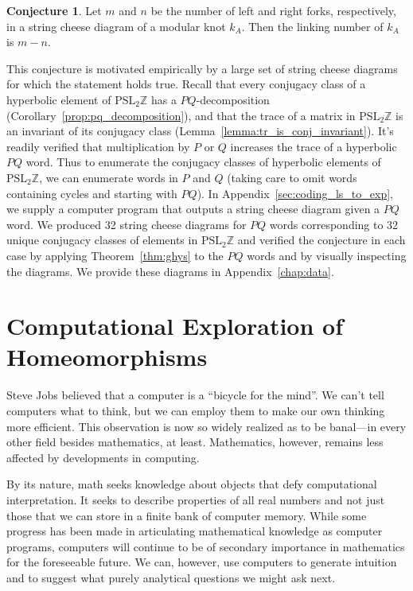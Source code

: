 \documentclass[12pt,twoside]{reedthesis}
\theoremstyle{definition}
\newtheorem{conj}[thm]{Conjecture}
\newcommand{\Z}{\mathbb{Z}}
\newcommand{\PSLZ}{\mathrm{PSL}_2{\Z}}
\begin{document}
\begin{conj}\label{conj:forking_number}
  Let $m$ and $n$ be the number of left and right forks, respectively, in a string cheese diagram of a modular knot $k_A$.
  Then the linking number of $k_A$ is $m - n$.
\end{conj}

\vspace{-1em}

This conjecture is motivated empirically by a large set of string cheese diagrams for which the statement holds true.
Recall that every conjugacy class of a hyperbolic element of $\PSLZ$ has a $PQ$-decomposition (Corollary~\ref{prop:pq_decomposition}), and that the trace of a matrix in $\PSLZ$ is an invariant of its conjugacy class (Lemma~\ref{lemma:tr_is_conj_invariant}).
It's readily verified that multiplication by $P$ or $Q$ increases the trace of a hyperbolic $PQ$ word.
Thus to enumerate the conjugacy classes of hyperbolic elements of $\PSLZ$, we can enumerate words in $P$ and $Q$ (taking care to omit words containing cycles and starting with $PQ$).
In Appendix~\ref{sec:coding_ls_to_exp}, we supply a computer program that outputs a string cheese diagram given a $PQ$ word.
We produced 32 string cheese diagrams for $PQ$ words corresponding to 32 unique conjugacy classes of elements in $\PSLZ$ and verified the conjecture in each case  by applying Theorem~\ref{thm:ghys} to the $PQ$ words and by visually inspecting the diagrams.
We provide these diagrams in Appendix~\ref{chap:data}.

\newpage
\appendix

\chapter{Computational Exploration of Homeomorphisms}

Steve Jobs believed that a computer is a ``bicycle for the mind''\cite{krainin1990}.
We can't tell computers what to think, but we can employ them to make our own thinking more efficient.
This observation is now so widely realized as to be banal---in every other field besides mathematics, at least.
Mathematics, however, remains less affected by developments in computing.

By its nature, math seeks knowledge about objects that defy computational interpretation.
It seeks to describe properties of all real numbers and not just those that we can store in a finite bank of computer memory.
While some progress has been made in articulating mathematical knowledge as computer programs, computers will continue to be of secondary importance in mathematics for the foreseeable future.
We can, however, use computers to generate intuition and to suggest what purely analytical questions we might ask next.
\end{document}
